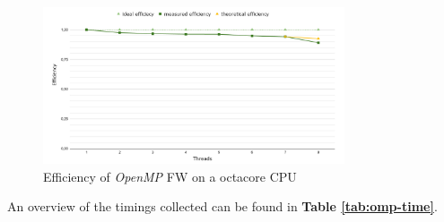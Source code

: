 \begin{figure}[h!]
\centering                                                                        
\includegraphics[width=3.5in]{diagrams/openmp-efficiency}
\captionsetup{justification=centering,margin=2cm}                                                                                                                                   
\caption{Efficiency of \emph{OpenMP} FW on a octacore CPU}                                                                                                                                            
\label{fig:omp-efficiency}                                                                                                                                                           
\end{figure}
An overview of the timings collected can be found in \textbf{Table \ref*{tab:omp-time}}.













































































